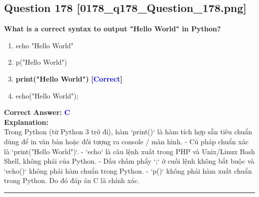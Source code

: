 \documentclass[11pt,a4paper]{article}
\begin{document}
\begin{minipage}{\textwidth}
\subsection*{Question 178 \quad \footnotesize{[0178_q178_Question_178.png]}}
\noindent \textbf{What is a correct syntax to output "Hello World" in Python?}

\begin{enumerate}[label=\Alph*.]
    \item echo "Hello World"
    \item p("Hello World")
    \item \textbf{print("Hello World")} \hfill \textcolor{blue}{\textbf{[Correct]}}
    \item echo("Hello World");
\end{enumerate}

\noindent \textbf{Correct Answer:} \textcolor{blue}{\textbf{C}} \\[4pt]
\noindent \textbf{Explanation:}\\
Trong Python (từ Python 3 trở đi), hàm `print()` là hàm tích hợp sẵn tiêu chuẩn dùng để in văn bản hoặc đối tượng ra console / màn hình.\newline
- Cú pháp chuẩn xác là `print("Hello World")`.\newline
- `echo` là câu lệnh xuất trong PHP và Unix/Linux Bash Shell, không phải của Python.\newline
- Dấu chấm phẩy `;` ở cuối lệnh không bắt buộc và `echo()` không phải hàm chuẩn trong Python.\newline
- `p()` không phải hàm xuất chuẩn trong Python.\newline
Do đó đáp án C là chính xác.
\end{minipage}
\vspace{0.8cm}
\hrule
\vspace{0.5cm}
\end{document}
